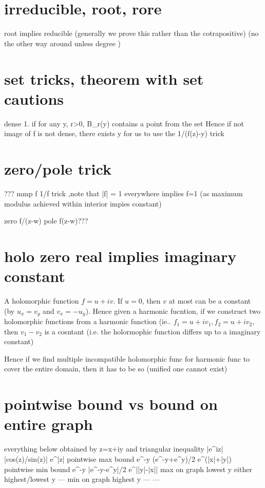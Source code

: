 \section{irreducible, root, rore}
root implies reducible (generally we prove this rather than the cotrapositive)
(no the other way around unless degree )

\section*{set tricks, theorem with set cautions}

dense
1. if for any y, r>0, B_r(y) contains a point from the set
	Hence if not image of f is not dense, there exists y for us
	to use the 1/(f(z)-y) trick
	


\section*{zero/pole trick}	
	??? mmp f 1/f trick ,note that |f| = 1 everywhere implies f=1 (as maximum modulus achieved within interior impies constant)
	
	zero f/(z-w)
	pole f(z-w)???
	
\section*{holo zero real implies imaginary constant}
A holomorphic function $f=u+iv$. If $u = 0$, then $v$ at most can be a constant (by $u_x = v_y$ and $v_x = -u_y$). Hence given a harmonic fucntion, if we construct two holomorphic functions from a harmonic function (ie.. $f_1 = u+iv_1, f_2 = u+iv_2$, then $v_1-v_2$ is a cosntant (i.e. the holormophic function differs up to a imaginary constant)

Hence if we find multiple incompatible holomorphic func for harmonic func to cover the entire domain, then it has to be so (unified one cannot exist)

\section*{pointwise bound vs bound on entire graph}
everything below obtained by z=x+iy and triangular inequality
							|e^{iz}|		|cos(z)/sin(z)|			e^{|z|}
pointwise max bound			e^{-y}			(e^{-y}+e^y)/2			e^(|x|+|y|)		
pointwise min bound			e^{-y}			|e^{-y}-e^y|/2			e^{||y|-|x||}
max on graph				lowest y	either highest/lowest y			---
min on graph				highest y			---						---

